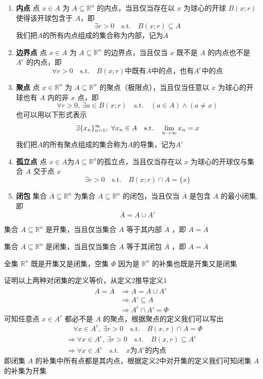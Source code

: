\documentclass{ctexbook}
\newcommand{\no}{\noindent}
\newcommand{\pro}{\no{\bf 证明：}}
\newcommand{\R}{\mathbb{R}}
\newcommand{\st}{\mathrm{\quad s.t.\quad }}
\newcommand{\ITEMS}{\begin{enumerate}[leftmargin=4em]}
\newcommand{\ITEME}{\end{enumerate}}
\begin{document}
\ITEMS
	\item {\bf 内点} 点 $x\in A$ 为 $A \subseteq \R^n$ 的内点，当且仅当存在以 $x$ 为球心的开球 $B(x;r)$ 使得该开球包含于 $A$，即
	\[
		\exists r > 0 \st B(x;r)\subseteq A
	\]
	我们把$A$的所有内点组成的集合称为内部，记为$\mathring{A}$
	
	\item {\bf 边界点} 点 $x\in A$ 为 $A \subseteq \R^n$ 的边界点，当且仅当 $x$ 既不是 $A$ 的内点也不是 $A^c$ 的内点，即
	\[
		\forall r > 0 \st B(x;r)\mbox{中既有}A\mbox{中的点，也有}A^c\mbox{中的点}
	\]

	\item {\bf 聚点} 点 $x\in \R^n$ 为 $A \subseteq \R^n$ 的聚点（极限点），当且仅当任意以 $x$ 为球心的开球也有 $A$ 内的非 $x$ 点，即	%
	\[
		\forall r>0 ,\ \exists a\in B(x;r)\st (a\in A)\land(a\neq x)
	\]
	也可以用以下形式表示
	\[
		\exists\{x_n\}_{n=1}^\infty,\ \forall x_n\in A \st\lim_{n\to\infty}x_n=x\\
	\]
	我们把$A$的所有聚点组成的集合称为$A$的导集，记为$A'$

	\item {\bf 孤立点} 点 $x\in A$为$A \subseteq \R^n$的孤立点，当且仅当存在以 $x$ 为球心的开球仅与集合 $A$ 交于点 $x$
	\[
		\exists r>0 \st B(x;r)\cap A=\{x\}
	\]
	
	\item {\bf 闭包} 集合 $\overline A\subseteq \R^n$ 为集合 $A\subseteq \R^n$ 的闭包，当且仅当 $\overline A$ 是包含 $A$ 的最小闭集,即
	\[
		\overline A = A \cup A'
	\]
\ITEME

集合 $A\subseteq\R^n$ 是开集，当且仅当集合 $A$ 等于其内部 $\mathring A$ ，即 $A = \mathring A$

集合 $A\subseteq\R^n$ 是闭集，当且仅当集合 $A$ 等于其闭包 $\overline A$ ，即 $A = \overline A$

全集 $\R^n$ 既是开集又是闭集，空集 $\Phi$ 因为是 $\R^n$ 的补集也既是开集又是闭集
\bigskip

\pro 

	证明以上两种对闭集的定义等价，从定义2推导定义1
	\[
		\begin{aligned}
			A = \overline A &\Rightarrow A = A \cup A'\\ %
			& \Rightarrow A' \subseteq A\\
			& \Rightarrow A^c \cap A' = \Phi %
		\end{aligned}
	\]
	可知任意点 $x\in A^c$ 都必不是 $A$ 的聚点，根据聚点的定义我们可以写出
	\[
		\begin{aligned}
			&\quad\forall x\in A^c,\ \exists r>0 \st B(x,r)\cap A = \Phi\\
			&\Rightarrow \forall x\in A^c,\ \exists r>0 \st B(x,r)\subseteq A^c\\ %
			&\Rightarrow \forall x\in A^c\st x \mbox{为}A^c\mbox{的内点} 
		\end{aligned}
	\]
	即闭集 $A$ 的补集中所有点都是其内点，根据定义2中对开集的定义我们可知闭集 $A$ 的补集为开集
	
\end{document}
